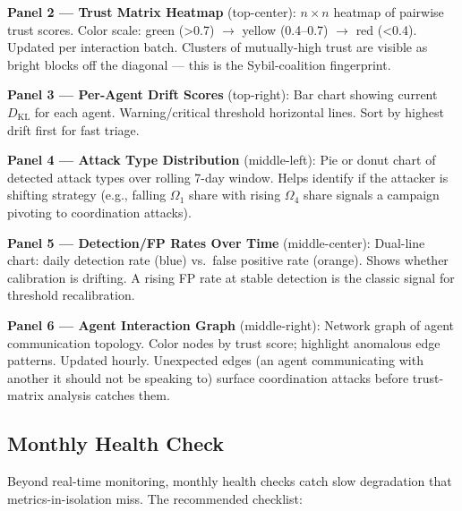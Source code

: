 \documentclass[
]{article}
\begin{document}
\textbf{Panel 2 --- Trust Matrix Heatmap} (top-center): \(n \times n\)
heatmap of pairwise trust scores. Color scale: green (\textgreater0.7) \texorpdfstring{\ensuremath{\to}}{->}
yellow (0.4--0.7) \texorpdfstring{\ensuremath{\to}}{->} red (\textless0.4). Updated per interaction batch.
Clusters of mutually-high trust are visible as bright blocks off the
diagonal --- this is the Sybil-coalition fingerprint.

\textbf{Panel 3 --- Per-Agent Drift Scores} (top-right): Bar chart
showing current \(D_{\mathrm{KL}}\) for each agent. Warning/critical
threshold horizontal lines. Sort by highest drift first for fast triage.

\textbf{Panel 4 --- Attack Type Distribution} (middle-left): Pie or
donut chart of detected attack types over rolling 7-day window. Helps
identify if the attacker is shifting strategy (e.g., falling
\(\Omega_1\) share with rising \(\Omega_4\) share signals a campaign
pivoting to coordination attacks).

\textbf{Panel 5 --- Detection/FP Rates Over Time} (middle-center):
Dual-line chart: daily detection rate (blue) vs.~false positive rate
(orange). Shows whether calibration is drifting. A rising FP rate at
stable detection is the classic signal for threshold recalibration.

\textbf{Panel 6 --- Agent Interaction Graph} (middle-right): Network
graph of agent communication topology. Color nodes by trust score;
highlight anomalous edge patterns. Updated hourly. Unexpected edges (an
agent communicating with another it should not be speaking to) surface
coordination attacks before trust-matrix analysis catches them.

\subsection{Monthly Health Check}\label{monthly-health-check}

Beyond real-time monitoring, monthly health checks catch slow
degradation that metrics-in-isolation miss. The recommended checklist:
\end{document}
